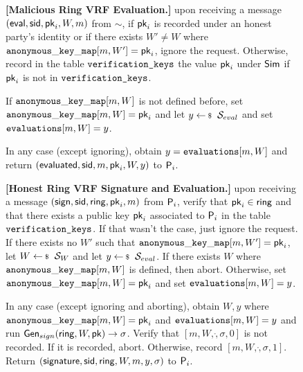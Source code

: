 \begin{figure}
\begin{tcolorbox}[left=2pt,right=2pt]
{			\textbf{[Malicious Ring VRF Evaluation.]} upon receiving a message $(\mathsf{eval}, \textsf{sid}, \mathsf{pk}_i, W, m)$ from $\sim$, if $ \mathsf{pk}_i $ is recorded under an honest party's identity or if there exists $ W'\neq W $ where $ \mathtt{anonymous\_key\_map}[m,W'] = \mathsf{pk}_i $, ignore the request.
			Otherwise, record in the table $\texttt{verification\_keys}$ the value $\mathsf{pk}_i$ under $\mathsf{Sim}$ if $ \mathsf{pk}_i $ is not in $ \texttt{verification\_keys} $.
			
			 If  $\mathtt{anonymous\_key\_map}[m,W]  $ is not defined before, set $ \mathtt{anonymous\_key\_map}[m,W] = \mathsf{pk}_i $ and let   $y \leftsample \setsym{S}_{eval}$ and set $ \texttt{evaluations}[m, W] = y$.
			
			In any case (except ignoring), obtain $ y = \texttt{evaluations}[m, W] $ and return $(\mathsf{evaluated}, \textsf{sid},  m, \mathsf{pk}_i,W, y)$ to $ \mathsf{P}_i $.

				
			\textbf{[Honest Ring VRF Signature and Evaluation.]} upon receiving a message $(\mathsf{sign}, \textsf{sid}, \mathsf{ring}, \mathsf{pk}_i, m)$ from $\mathsf{P}_i$, verify that $\mathsf{pk}_i \in \mathsf{ring}$ and that there exists a public key $\mathsf{pk}_i$ associated to $\mathsf{P}_i$ in the table $ \texttt{verification\_keys} $. If that wasn't the case, just ignore the request. 	
			If there exists no $ W' $ such that $ \mathtt{anonymous\_key\_map}[m,W'] =  \mathsf{pk}_i $, let $ W \leftsample \setsym{S}_W $ and let $y \leftsample \setsym{S}_{eval}$. If there exists $ W $ where $ \mathtt{anonymous\_key\_map}[m,W] $ is defined, then abort. Otherwise, set $ \mathtt{anonymous\_key\_map}[m,W] = \mathsf{pk}_i $ and set $ \texttt{evaluations}[m, W] = y$.
			
			In any case (except ignoring and aborting), obtain $ W, y $ where $ \mathtt{anonymous\_key\_map}[m,W] =\mathsf{pk}_i $ and $ \texttt{evaluations}[m, W] = y$  and run  $ \mathsf{Gen}_{sign}(\mathsf{ring}, W,\mathsf{pk}) \rightarrow \sigma $. Verify that $ [m, W,\ring, \sigma, 0] $ is not recorded. If it is recorded, abort. Otherwise, record $ [m, W, \ring,\sigma, 1] $. Return $(\mathsf{signature}, \textsf{sid}, \mathsf{ring},W,m, y, \sigma)$ to $\mathsf{P}_i$.
			
}
\end{tcolorbox}
\end{figure}
